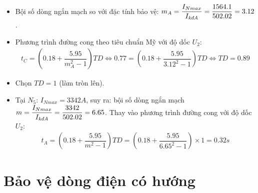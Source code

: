 \documentclass[12pt,a4paper]{article}
\begin{document}
\begin{enumerate}[1.]
\begin{itemize}
\begin{itemize}
							\item Bội số dòng ngắn mạch so với đặc tính bảo vệ: $m_A = \dfrac{I_{Nmax}}{I_{\text{\textit{kđA}}}} = \dfrac{1564.1}{502.02} = 3.12$.
							
							\item Phương trình đường cong theo tiêu chuẩn Mỹ với độ dốc $U_2$:
								\begin{align*}
									t_C = \left({0.18 + \dfrac{5.95}{m_A^2 - 1}}\right)TD	\Longleftrightarrow 0.77 = \left({0.18 + \dfrac{5.95}{3.12^2 - 1}}\right)TD \Longleftrightarrow TD = 0.89
								\end{align*}
							
							\item Chọn $TD = 1$ (làm tròn lên).
							
							\item Tại $N_5$: $I_{Nmax} =3342 \unit{A}$, suy ra: bội số dòng ngắn mạch $m = \dfrac{I_{Nmax}}{I_{\text{\textit{kđA}}}} = \dfrac{3342}{502.02} = 6.65$. Thay vào phương trình đường cong với độ dốc $U_2$:
								\begin{align*}
									t_A = \left({0.18 + \dfrac{5.95}{m^2 - 1}}\right)TD = \left({0.18 + \dfrac{5.95}{6.65^2 - 1}}\right) \times 1 = 0.32 \unit{s}
								\end{align*}
						\end{itemize}
				\end{itemize}			
	\end{enumerate}

\newpage
\section{Bảo vệ dòng điện có hướng}
\end{document}
